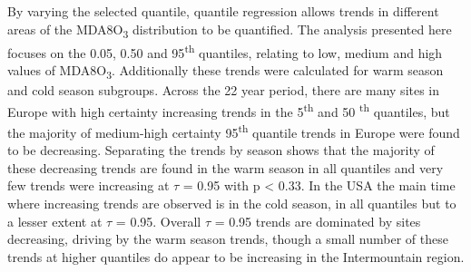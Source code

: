 \documentclass[journal abbreviation, manuscript]{copernicus}
\begin{document}
By varying the selected quantile, quantile regression allows trends in different areas of the MDA8O\textsubscript{3} distribution to be quantified. The analysis presented here focuses on the 0.05, 0.50 and 95\textsuperscript{th} quantiles, relating to low, medium and high values of MDA8O\textsubscript{3}. Additionally these trends were calculated for warm season and cold season subgroups. 
Across the 22 year period, there are many sites in Europe with high certainty increasing trends in the 5\textsuperscript{th} and 50 \textsuperscript{th} quantiles, but the majority of medium-high certainty 95\textsuperscript{th} quantile trends in Europe were found to be decreasing. Separating the trends by season shows that the majority of these decreasing trends are found in the warm season in all quantiles and very few trends were increasing at $\tau$ = 0.95 with p < 0.33. In the USA the main time where increasing trends are observed is in the cold season, in all quantiles but to a lesser extent at $\tau$ = 0.95. Overall $\tau$ = 0.95 trends are dominated by sites decreasing, driving by the warm season trends, though a small number of these trends at higher quantiles do appear to be increasing in the Intermountain region.
\end{document}
